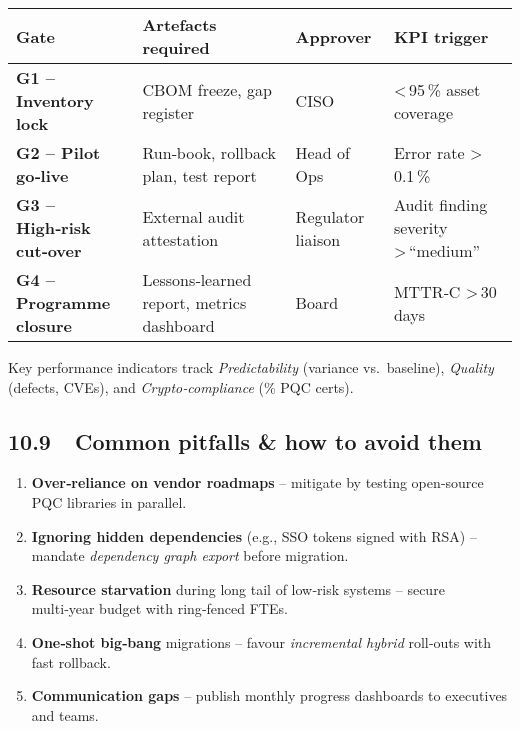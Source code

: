 \documentclass[
  english,
]{article}
\providecommand{\tightlist}{%
  \setlength{\itemsep}{0pt}\setlength{\parskip}{0pt}}
\begin{document}
\begin{longtable}[]{@{}
  >{\raggedright\arraybackslash}p{}
  >{\raggedright\arraybackslash}p{}
  >{\raggedright\arraybackslash}p{}
  >{\raggedright\arraybackslash}p{}@{}}
\toprule\noalign{}
\begin{minipage}[b]{\linewidth}\raggedright
Gate
\end{minipage} & \begin{minipage}[b]{\linewidth}\raggedright
Artefacts required
\end{minipage} & \begin{minipage}[b]{\linewidth}\raggedright
Approver
\end{minipage} & \begin{minipage}[b]{\linewidth}\raggedright
KPI trigger
\end{minipage} \\
\midrule\noalign{}
\endhead
\bottomrule\noalign{}
\endlastfoot
\textbf{G1 -- Inventory lock} & CBOM freeze, gap register & CISO &
\textless\,95\,\% asset coverage \\
\textbf{G2 -- Pilot go‑live} & Run‑book, rollback plan, test report &
Head of Ops & Error rate \textgreater\,0.1\,\% \\
\textbf{G3 -- High‑risk cut‑over} & External audit attestation &
Regulator liaison & Audit finding severity \textgreater\,``medium'' \\
\textbf{G4 -- Programme closure} & Lessons‑learned report, metrics
dashboard & Board & MTTR‑C \textgreater\,30\,days \\
\end{longtable}

Key performance indicators track \emph{Predictability} (variance
vs.~baseline), \emph{Quality} (defects, CVEs), and
\emph{Crypto‑compliance} (\% PQC certs).

\subsection{10.9~~Common pitfalls \& how to avoid
them}\label{common-pitfalls-how-to-avoid-them}

\begin{enumerate}
\def\labelenumi{\arabic{enumi}.}
\tightlist
\item
  \textbf{Over‑reliance on vendor roadmaps} -- mitigate by testing
  open‑source PQC libraries in parallel.
\item
  \textbf{Ignoring hidden dependencies} (e.g., SSO tokens signed with
  RSA) -- mandate \emph{dependency graph export} before migration.
\item
  \textbf{Resource starvation} during long tail of low‑risk systems --
  secure multi‑year budget with ring‑fenced FTEs.
\item
  \textbf{One‑shot big‑bang} migrations -- favour \emph{incremental
  hybrid} roll‑outs with fast rollback.
\item
  \textbf{Communication gaps} -- publish monthly progress dashboards to
  executives and teams.
\end{enumerate}
\end{document}
